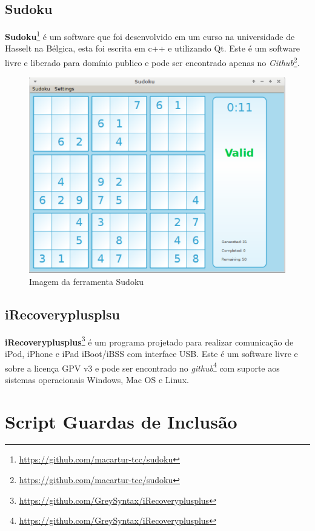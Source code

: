 \begin{apendicesenv}
\section{Sudoku}

    \textbf{Sudoku}\footnote{\url{https://github.com/macartur-tcc/sudoku}} é um software que foi
 desenvolvido em um curso na universidade de Hasselt na Bélgica, esta foi escrita em c++ e utilizando Qt.
 Este é um software livre e liberado para domínio publico e pode ser encontrado apenas
 no \textit{Github}\footnote{\url{https://github.com/macartur-tcc/sudoku}}.

    \begin{figure}[h]
        \centering
            \includegraphics[scale=0.3]{figuras/sudoku.eps}
        \caption{Imagem da ferramenta Sudoku}
        \label{ferramenta_qcad}
    \end{figure}

\section{iRecoveryplusplsu}

    \textbf{iRecoveryplusplus}\footnote{\url{https://github.com/GreySyntax/iRecoveryplusplus}}
 é um programa projetado para realizar comunicação de iPod, iPhone e iPad iBoot/iBSS  com interface USB. 
Este é um software livre e sobre a licença GPV v3 e pode ser encontrado
 no \textit{github}\footnote{\url{https://github.com/GreySyntax/iRecoveryplusplus}} com
 suporte aos sistemas operacionais Windows, Mac OS e Linux.


\chapter{Script Guardas de Inclusão}
\label{script_benchmark}


\end{apendicesenv}

